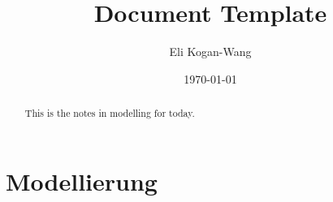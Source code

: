 \documentclass[a4paper,12pt]{article}
\title{Document Template}
\author{Eli Kogan-Wang}
\date{\today}
\begin{document}
\renewcommand{\abstractname}{Abstract}
\begin{abstract}
    This is the notes in modelling for today.
\end{abstract}

\section{Modellierung}
\end{document}
